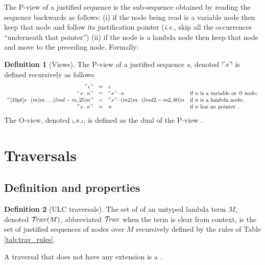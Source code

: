 \documentclass{article}
\makeatletter
\theoremstyle{definition}
\newtheorem{definition}{Definition}[section]
\newcommand{\travulc}{\travset}
\renewcommand\ie{{\it i.e.\@\xspace}}
\makeatother
\begin{document}
The P-view of a justified sequence is the sub-sequence obtained by reading the sequence backwards as follows: (i) if the node being read is a variable node then keep that node and follow its justification pointer (\ie, skip all the occurrences ``underneath that pointer'') (ii) if the node is a lambda node then keep that node and move to the preceding node. Formally:
\begin{definition}[Views]
\label{def:views}
The P-view of a justified sequence $s$, denoted $\ulcorner s \urcorner$ is defined recursively  as follows
$$\begin{array}{rcll}
 \pview{\epsilon} &=&  \epsilon \\
 \pview{s \cdot n }  &=&  \pview{s} \cdot n
    & \mbox{if $n$ is a variable or $@$ node;}
    \\
 \pview{\Pstr[10pt]{ s \cdot (m){m} \ldots (lmd-m,25){n}}} &=&
        \Pstr{ \pview{s} \cdot (m2){m} \cdot (lmd2-m2,60){n} }
    & \mbox{if $n$ is a lambda node;}
    \\
 \pview{s \cdot n }  &=&  n & \mbox{if $n$ has no pointer}\enspace .
\end{array}$$
The O-view, denoted $\llcorner s \lrcorner$, is defined as the dual of the P-view \cite{Abr02}.
\end{definition}

\section{Traversals}

\subsection{Definition and properties}

\begin{definition}[ULC traversals]
The set of  of an untyped lambda term $M$, denoted $\travulc(M)$, abbreviated $\travulc$ when the term is clear from context, is the set of justified sequences of nodes over $M$ recursively defined by the rules of Table \ref{tab:trav_rules}.

A traversal that does not have any extension is a .
\end{definition}
\end{document}

